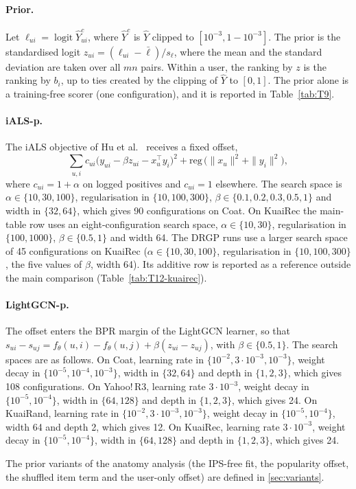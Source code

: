 \paragraph{Prior.}
Let $\ell_{ui}=\operatorname{logit}\hat Y^{c}_{ui}$, where $\hat Y^{c}$ is $\hat Y$ clipped to
$[10^{-3},1-10^{-3}]$. The prior is the standardised logit $z_{ui}=(\ell_{ui}-\bar\ell)/s_\ell$, where the mean
and the standard deviation are taken over all $mn$ pairs. Within a user, the ranking by $z$ is the ranking by
$b_i$, up to ties created by the clipping of $\hat Y$ to $[0,1]$. The prior alone is a training-free scorer
(one configuration), and it is reported in Table~\ref{tab:T9}.

\paragraph{iALS-p.}
The iALS objective of Hu et al.~\citep{hu2008ials} receives a fixed offset,
\begin{equation*}
\sum_{u,i}c_{ui}\bigl(y_{ui}-\beta z_{ui}-x_u^{\top}y_i\bigr)^2+\mathrm{reg}\,\bigl(\|x_u\|^2+\|y_i\|^2\bigr),
\end{equation*}
where $c_{ui}=1+\alpha$ on logged positives and $c_{ui}=1$ elsewhere. The search space is $\alpha\in\{10,30,100\}$,
regularisation in $\{10,100,300\}$, $\beta\in\{0.1,0.2,0.3,0.5,1\}$ and width in $\{32,64\}$, which gives 90
configurations on Coat. On KuaiRec the main-table row uses an eight-configuration search space, $\alpha\in\{10,30\}$,
regularisation in $\{100,1000\}$, $\beta\in\{0.5,1\}$ and width 64. The DRGP runs use a larger search space of 45
configurations on KuaiRec ($\alpha\in\{10,30,100\}$, regularisation in $\{10,100,300\}$, the five values of
$\beta$, width 64). Its additive row is reported as a reference outside the main comparison (Table~\ref{tab:T12-kuairec}).

\paragraph{LightGCN-p.}
The offset enters the BPR margin of the LightGCN learner, so that $s_{ui}-s_{uj}=f_\theta(u,i)-f_\theta(u,j)+\beta(z_{ui}-z_{uj})$,
with $\beta\in\{0.5,1\}$. The search spaces are as follows. On Coat, learning rate in $\{10^{-2},3\cdot10^{-3},10^{-3}\}$,
weight decay in $\{10^{-5},10^{-4},10^{-3}\}$, width in $\{32,64\}$ and depth in $\{1,2,3\}$, which gives 108
configurations. On Yahoo!\,R3, learning rate $3\cdot10^{-3}$, weight decay in $\{10^{-5},10^{-4}\}$, width in
$\{64,128\}$ and depth in $\{1,2,3\}$, which gives 24. On KuaiRand, learning rate in $\{10^{-2},3\cdot10^{-3},10^{-3}\}$,
weight decay in $\{10^{-5},10^{-4}\}$, width 64 and depth 2, which gives 12. On KuaiRec, learning rate
$3\cdot10^{-3}$, weight decay in $\{10^{-5},10^{-4}\}$, width in $\{64,128\}$ and depth in $\{1,2,3\}$, which gives
24.

The prior variants of the anatomy analysis (the IPS-free fit, the popularity offset, the shuffled item term and the user-only offset) are defined in \ref{sec:variants}.
